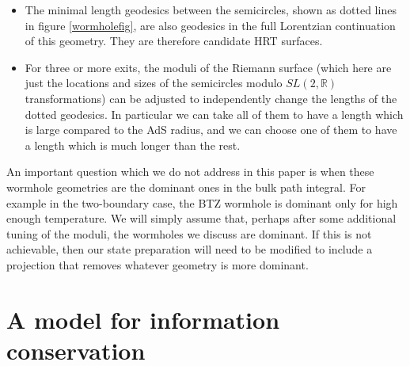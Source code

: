 \documentclass[12pt]{article}
\newcommand{\bi}{\begin{itemize}}
\newcommand{\ei}{\end{itemize}}
\theoremstyle{definition}
\begin{document}
\bi
\item The minimal length geodesics between the semicircles, shown as dotted lines in figure \ref{wormholefig}, are also geodesics in the full Lorentzian continuation of this geometry.  They are therefore candidate HRT surfaces.  
\item For three or more exits, the moduli of the Riemann surface (which here are just the locations and sizes of the semicircles modulo $SL(2,\mathbb{R})$ transformations) can be adjusted to independently change the lengths of the dotted geodesics.  In particular we can take all of them to have a length which is large compared to the AdS radius, and we can choose one of them to have a length which is much longer than the rest.
\ei
An important question which we do not address in this paper is when these wormhole geometries are the dominant ones in the bulk path integral.  For example in the two-boundary case, the BTZ wormhole is dominant only for high enough temperature.  We will simply assume that, perhaps after some additional tuning of the moduli, the wormholes we discuss are dominant.  If this is not achievable, then our state preparation will need to be modified to include a projection that removes whatever geometry is more dominant.

\section{A model for information conservation}
\end{document}
